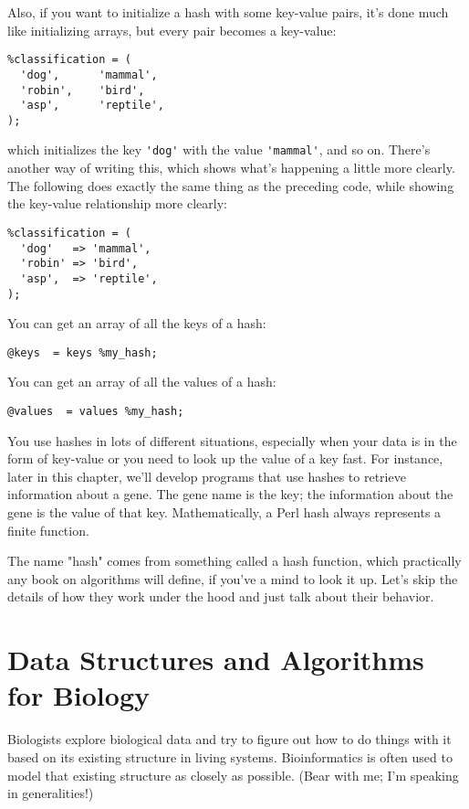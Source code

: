 Also, if you want to initialize a hash with some key-value pairs, it's done much like initializing arrays, but every pair becomes a key-value: 

\begin{lstlisting}
%classification = (
  'dog',      'mammal',
  'robin',    'bird',
  'asp',      'reptile',
);
\end{lstlisting}

which initializes the key \verb|'dog'| with the value \verb|'mammal'|, and so on. There's another way of writing this, which shows what's happening a little more clearly. The following does exactly the same thing as the preceding code, while showing the key-value relationship more clearly: 

\begin{lstlisting}
%classification = (
  'dog'   => 'mammal',
  'robin' => 'bird',
  'asp',  => 'reptile',
);
\end{lstlisting}

You can get an array of all the keys of a hash:

\begin{lstlisting}
@keys  = keys %my_hash;
\end{lstlisting}

You can get an array of all the values of a hash:

\begin{lstlisting}
@values  = values %my_hash;
\end{lstlisting}

You use hashes in lots of different situations, especially when your data is in the form of key-value or you need to look up the value of a key fast. For instance, later in this chapter, we'll develop programs that use hashes to retrieve information about a gene. The gene name is the key; the information about the gene is the value of that key. Mathematically, a Perl hash always represents a finite function.

The name "hash" comes from something called a hash function, which practically any book on algorithms will define, if you've a mind to look it up. Let's skip the details of how they work under the hood and just talk about their behavior. 

\section{Data Structures and Algorithms for Biology}
Biologists explore biological data and try to figure out how to do things with it based on its existing structure in living systems. Bioinformatics is often used to model that existing structure as closely as possible. (Bear with me; I'm speaking in generalities!)

